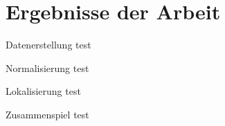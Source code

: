 \section{Ergebnisse der Arbeit}

\begin{frame}{Datenerstellung}
    test
\end{frame}

\begin{frame}{Normalisierung}
    test
\end{frame}

\begin{frame}{Lokalisierung}
    test
\end{frame}

\begin{frame}{Zusammenspiel}
    test
\end{frame}
